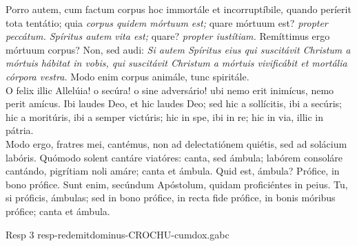 \documentclass[options]{article}
\begin{document}
	Porro autem, cum factum corpus hoc immortále et incorruptíbile, quando períerit tota tentátio; quia \emph{corpus quidem mórtuum est;} quare mórtuum est? \emph{propter peccátum. Spíritus autem vita est;} quare? \emph{propter iustítiam.} Remíttimus ergo mórtuum corpus? Non, sed audi: \emph{Si autem Spíritus eius qui suscitávit Christum a mórtuis hábitat in vobis, qui suscitávit Christum a mórtuis vivificábit et mortália córpora vestra.} Modo enim corpus animále, tunc spiritále.\\ 
	O felix illic Allelúia! o secúra! o sine adversário! ubi nemo erit inimícus, nemo perit amícus. Ibi laudes Deo, et hic laudes Deo; sed hic a sollícitis, ibi a secúris; hic a moritúris, ibi a semper victúris; hic in spe, ibi in re; hic in via, illic in pátria.\\ 
	Modo ergo, fratres mei, cantémus, non ad delectatiónem quiétis, sed ad solácium labóris. Quómodo solent cantáre viatóres: canta, sed ámbula; labórem consoláre cantándo, pigrítiam noli amáre; canta et ámbula. Quid est, ámbula? Prófice, in bono prófice. Sunt enim, secúndum Apóstolum, quidam proficiéntes in peius. Tu, si próficis, ámbulas; sed in bono prófice, in recta fide prófice, in bonis móribus prófice; canta et ámbula. 
	
	Resp 3 resp-redemitdominus-CROCHU-cumdox.gabc
	
	
\end{document}
